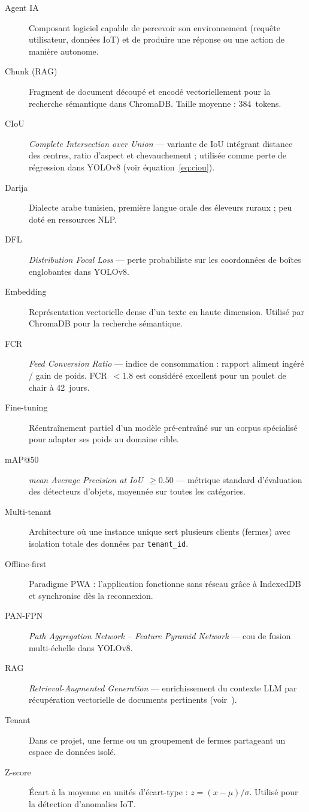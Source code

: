 \documentclass[12pt,a4paper,twoside]{report}
\newcommand{\code}[1]{\texttt{#1}}
\newcounter{hi}
\begin{document}
\begin{description}
  \item[Agent IA] Composant logiciel capable de percevoir son environnement
    (requête utilisateur, données IoT) et de produire une réponse ou une
    action de manière autonome.
  \item[Chunk (RAG)] Fragment de document découpé et encodé vectoriellement
    pour la recherche sémantique dans ChromaDB. Taille moyenne : 384~tokens.
  \item[CIoU] \textit{Complete Intersection over Union} — variante de IoU
    intégrant distance des centres, ratio d'aspect et chevauchement ;
    utilisée comme perte de régression dans YOLOv8 (voir équation~\ref{eq:ciou}).
  \item[Darija] Dialecte arabe tunisien, première langue orale des éleveurs
    ruraux ; peu doté en ressources NLP.
  \item[DFL] \textit{Distribution Focal Loss} — perte probabiliste sur les
    coordonnées de boîtes englobantes dans YOLOv8.
  \item[Embedding] Représentation vectorielle dense d'un texte en haute
    dimension. Utilisé par ChromaDB pour la recherche sémantique.
  \item[FCR] \textit{Feed Conversion Ratio} — indice de consommation :
    rapport aliment ingéré / gain de poids. FCR~$< 1.8$ est considéré
    excellent pour un poulet de chair à 42~jours.
  \item[Fine-tuning] Réentraînement partiel d'un modèle pré-entraîné sur
    un corpus spécialisé pour adapter ses poids au domaine cible.
  \item[mAP@50] \textit{mean Average Precision at IoU~$\geq 0.50$} —
    métrique standard d'évaluation des détecteurs d'objets, moyennée sur
    toutes les catégories.
  \item[Multi-tenant] Architecture où une instance unique sert plusieurs
    clients (fermes) avec isolation totale des données par \code{tenant\_id}.
  \item[Offline-first] Paradigme PWA : l'application fonctionne sans
    réseau grâce à IndexedDB et synchronise dès la reconnexion.
  \item[PAN-FPN] \textit{Path Aggregation Network -- Feature Pyramid
    Network} — cou de fusion multi-échelle dans YOLOv8.
  \item[RAG] \textit{Retrieval-Augmented Generation} — enrichissement du
    contexte LLM par récupération vectorielle de documents pertinents
    (voir~\cite{lewis2020rag}).
  \item[Tenant] Dans ce projet, une ferme ou un groupement de fermes
    partageant un espace de données isolé.
  \item[Z-score] Écart à la moyenne en unités d'écart-type :
    $z = (x-\mu)/\sigma$. Utilisé pour la détection d'anomalies IoT.
\end{description}
\end{document}
